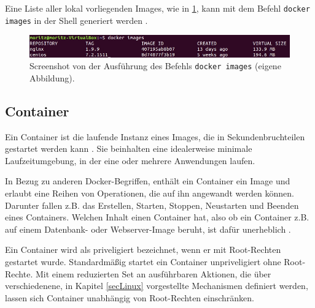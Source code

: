 \documentclass[../main.tex]{subfiles}
\begin{document}
			Eine Liste aller lokal vorliegenden Images, wie in \fig \ref{fig:intro_dockerImages}, kann mit dem Befehl \texttt{docker images} in der Shell generiert werden \cite{dockerImages}.

			\begin{figure}[!htbp]
          \centering
          \includegraphics[width=1.0\textwidth]{./images/intro_dockerImages.jpg}
          \caption{Screenshot von der Ausführung des Befehls \texttt{docker images} (eigene Abbildung).}
          \label{fig:intro_dockerImages}
      \end{figure}



    \subsection{Container}
		\label{dockerContainer}
			Ein Container ist die laufende Instanz eines Images, die in Sekundenbruchteilen gestartet werden kann \cite[S.1]{dockerIntroIEEE}. Sie beinhalten eine idealerweise minimale Laufzeitumgebung, in der eine oder mehrere Anwendungen laufen.

      In Bezug zu anderen Docker-Begriffen, enthält ein Container ein Image und erlaubt eine Reihen von Operationen, die auf ihn angewandt werden können. Darunter fallen z.B. das Erstellen, Starten, Stoppen, Neustarten und Beenden eines Containers. Welchen Inhalt einen Container hat, also ob ein Container z.B. auf einem Datenbank- oder Webserver-Image beruht, ist dafür unerheblich \cite[S.12]{dockerBook}\cite[S.2]{dockerLXCKub}.

      Ein Container wird als priveligiert bezeichnet, wenn er mit Root-Rechten gestartet wurde. Standardmäßig startet ein Container unpriveligiert ohne Root-Rechte. Mit einem reduzierten Set an ausführbaren Aktionen, die über verschiedenene, in Kapitel \ref{secLinux} vorgestellte Mechanismen definiert werden, lassen sich Container unabhängig von Root-Rechten einschränken.
\end{document}
